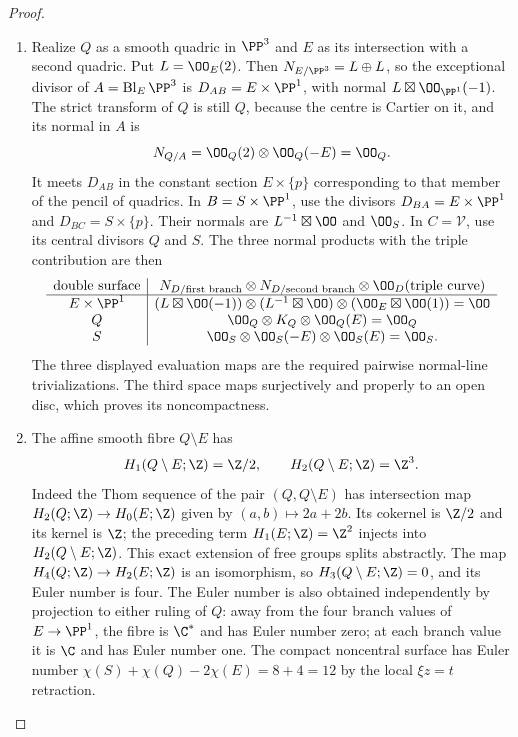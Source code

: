 \begin{proof}
\begin{enumerate}[label=\arabic*.,leftmargin=*]
\item Realize $Q$ as a smooth quadric in $\PP^3$ and $E$ as its
intersection with a second quadric.  Put $L=\OO_E(2)$.
Then $N_{E/\PP^3}=L\oplus L$, so the exceptional divisor
of $A=\operatorname{Bl}_E\PP^3$ is
$D_{AB}=E\times\PP^1$, with normal
$L\boxtimes\OO_{\PP^1}(-1)$.
The strict transform of $Q$ is still $Q$, because the centre is
Cartier on it, and its normal in $A$ is
\[
 N_{Q/A}=\OO_Q(2)\otimes\OO_Q(-E)=\OO_Q.
\]
It meets $D_{AB}$ in the constant section $E\times\{p\}$
corresponding to that member of the pencil of quadrics.
In $B=S\times\PP^1$, use the divisors
$D_{BA}=E\times\PP^1$ and $D_{BC}=S\times\{p\}$.
Their normals are $L^{-1}\boxtimes\OO$ and $\OO_S$.
In $C=\mathcal V$, use its central divisors $Q$ and $S$.
The three normal products with the triple contribution are then
\[
\begin{array}{c|c}
 \text{double surface}&
 N_{D/\text{first branch}}\otimes
 N_{D/\text{second branch}}\otimes\OO_D(\text{triple curve})\\ \hline
 E\times\PP^1&
 (L\boxtimes\OO(-1))\otimes(L^{-1}\boxtimes\OO)
       \otimes(\OO_E\boxtimes\OO(1))=\OO\\
 Q&\OO_Q\otimes K_Q\otimes\OO_Q(E)=\OO_Q\\
 S&\OO_S\otimes\OO_S(-E)\otimes\OO_S(E)=\OO_S.
\end{array}
\]
The three displayed evaluation maps are the required pairwise
normal-line trivializations. The third space maps surjectively and
properly to an open disc, which proves its noncompactness.

\item The affine smooth fibre $Q\setminus E$ has
\[
 H_1(Q\setminus E;\Z)=\Z/2,\qquad
 H_2(Q\setminus E;\Z)=\Z^3.
\]
Indeed the Thom sequence of the pair $(Q,Q\setminus E)$ has
intersection map $H_2(Q;\Z)\to H_0(E;\Z)$ given by
$(a,b)\mapsto2a+2b$.  Its cokernel is $\Z/2$ and its
kernel is $\Z$; the preceding term $H_1(E;\Z)=\Z^2$
injects into $H_2(Q\setminus E;\Z)$.
This exact extension of free groups splits abstractly.
The map $H_4(Q;\Z)\to H_2(E;\Z)$ is an isomorphism,
so $H_3(Q\setminus E;\Z)=0$, and its Euler number is four.
The Euler number is also obtained independently by projection
to either ruling of $Q$: away from the four branch values of
$E\to\PP^1$, the fibre is $\C^*$ and has Euler number zero;
at each branch value it is $\C$ and has Euler number one.
The compact noncentral surface has Euler number
$\chi(S)+\chi(Q)-2\chi(E)=8+4=12$ by the local $\xi z=t$ retraction.
\end{enumerate}
\end{proof}
